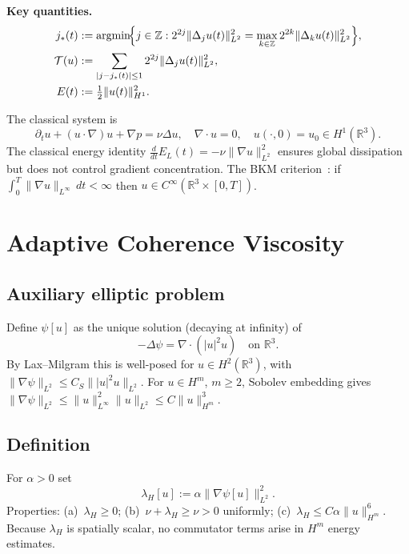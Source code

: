\documentclass[12pt]{amsart}
\theoremstyle{remark}
\newcommand{\R}{\mathbb{R}}
\newcommand{\Tcal}{\mathcal{T}}
\newcommand{\lH}{\lambda_H}
\begin{document}
\medskip\noindent\textbf{Key quantities.}
\begin{align}
  j_*(t) &:= \operatorname{argmin}\!\Bigl\{j\in\mathbb{Z}:
    2^{2j}\|\Delta_j u(t)\|_{L^2}^2 =
    \max_{k\in\mathbb{Z}} 2^{2k}\|\Delta_k u(t)\|_{L^2}^2\Bigr\},
    \label{eq:jstar}\\
  \Tcal(u) &:= \sum_{|j-j_*(t)|\le 1}
    2^{2j}\|\Delta_j u(t)\|_{L^2}^2,
    \label{eq:T}\\
  E(t) &:= \tfrac{1}{2}\|u(t)\|_{H^1}^2.
    \label{eq:E}
\end{align}

The classical system is
\begin{equation}\label{eq:NS}
  \partial_t u + (u\cdot\nabla)u + \nabla p = \nu\Delta u,
  \quad \nabla\cdot u = 0,
  \quad u(\cdot,0)=u_0\in H^1(\R^3).
\end{equation}
The classical energy identity
$\frac{d}{dt}E_L(t)=-\nu\|\nabla u\|_{L^2}^2$
ensures global dissipation but does not control gradient concentration.
The BKM criterion~\cite{BKM84}: if
$\int_0^T\|\nabla u\|_{L^\infty}\,dt<\infty$ then
$u\in C^\infty(\R^3\times[0,T])$.

\section{Adaptive Coherence Viscosity}
\label{sec:lH}

\subsection{Auxiliary elliptic problem}
Define $\psi[u]$ as the unique solution (decaying at infinity) of
\begin{equation}\label{eq:psi}
  -\Delta\psi = \nabla\cdot(|u|^2u)\quad\text{on }\R^3.
\end{equation}
By Lax--Milgram this is well-posed for $u\in H^2(\R^3)$, with
$\|\nabla\psi\|_{L^2}\le C_S\||u|^2u\|_{L^2}$.
For $u\in H^m$, $m\ge 2$, Sobolev embedding gives
$\|\nabla\psi\|_{L^2}\le\|u\|_{L^\infty}^2\|u\|_{L^2}\le C\|u\|_{H^m}^3$.

\subsection{Definition}
For $\alpha>0$ set
\begin{equation}\label{eq:lH}
  \lH[u]:=\alpha\|\nabla\psi[u]\|_{L^2}^2.
\end{equation}
Properties: (a)~$\lH\ge 0$; (b)~$\nu+\lH\ge\nu>0$ uniformly;
(c)~$\lH\le C\alpha\|u\|_{H^m}^6$.
Because $\lH$ is spatially scalar, no commutator terms arise in $H^m$
energy estimates.
\end{document}
